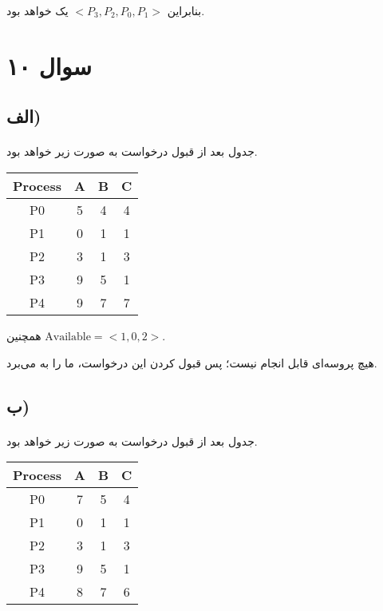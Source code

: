 \documentclass{article}
\begin{document}
	بنابراین
	$<P_3, P_2, P_0, P_1>$
	یک
	خواهد بود.

	\section*{سوال ۱۰}
	\subsection*{الف)}
	\paragraph*{}
	جدول
	بعد از قبول درخواست به صورت زیر خواهد بود.

	\begin{latin}
		\centering
		\begin{tabular}{c|c|c|c}
			Process & A & B & C \\
			\hline
			P0 & 5 & 4 & 4 \\
			\hline
			P1 & 0 & 1 & 1 \\
			\hline
			P2 & 3 & 1 & 3 \\
			\hline
			P3 & 9 & 5 & 1 \\
			\hline
			P4 & 9 & 7 & 7
		\end{tabular}
	\end{latin}

	همچنین
	$\textrm{Available} = <1, 0, 2>$.

	هیچ پروسه‌ای قابل انجام نیست؛ پس قبول کردن این درخواست، ما را به
	می‌برد.

	\subsection*{ب)}
	\paragraph*{}
	جدول
	بعد از قبول درخواست به صورت زیر خواهد بود.

	\begin{latin}
		\centering
		\begin{tabular}{c|c|c|c}
			Process & A & B & C \\
			\hline
			P0 & 7 & 5 & 4 \\
			\hline
			P1 & 0 & 1 & 1 \\
			\hline
			P2 & 3 & 1 & 3 \\
			\hline
			P3 & 9 & 5 & 1 \\
			\hline
			P4 & 8 & 7 & 6
		\end{tabular}
	\end{latin}
\end{document}
